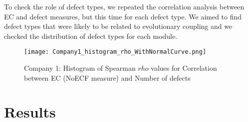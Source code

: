\documentclass[times]{smrauth}
\begin{document}
To check the role of defect types, we repeated the correlation analysis between EC and defect measures, but this time for each defect type. We aimed to find defect types that were likely to be related to evolutionary coupling and we checked the distribution of defect types for each module.    


%
%
%

\begin{figure}[h]
\centering
\texttt{[image: Company1\_histogram\_rho\_WithNormalCurve.png]}
\caption{Company 1: Histogram of Spearman $rho$ values for Correlation between EC (NoECF measure) and Number of  defects}
\label{Company1_histogram_rho}	
\end{figure}


\section{Results}
\end{document}

